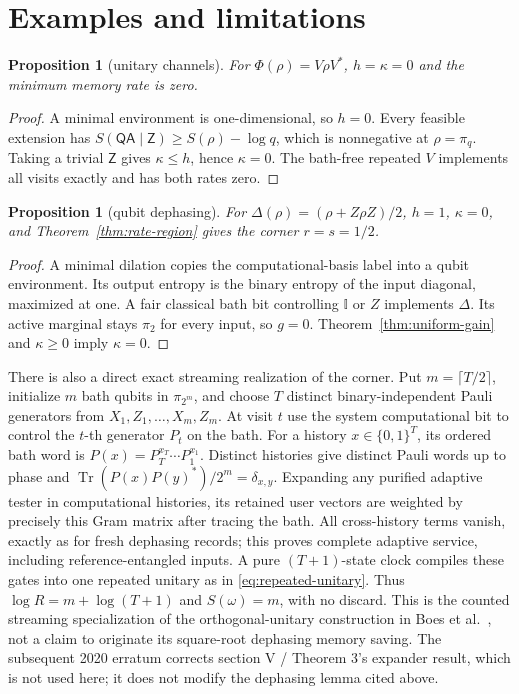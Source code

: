 \documentclass[11pt,a4paper]{article}
\numberwithin{equation}{section}
\theoremstyle{plain}
\newtheorem{proposition}[theorem]{Proposition}
\theoremstyle{definition}
\DeclareMathOperator{\Tr}{Tr}
\newcommand{\rg}[1]{\mathsf{#1}}
\newcommand{\one}{\mathbb{I}}
\begin{document}
\section{Examples and limitations}
\label{sec:examples}

\begin{proposition}[unitary channels]
\label{prop:unitary}
For $\Phi(\rho)=V\rho V^*$, $h=\kappa=0$ and the minimum memory rate is zero.
\end{proposition}

\begin{proof}
A minimal environment is one-dimensional, so $h=0$. Every feasible extension
has $S(\rg{Q}\rg{A}\mid\rg{Z})\ge S(\rho)-\log q$, which is nonnegative at
$\rho=\pi_q$. Taking a trivial $\rg{Z}$ gives $\kappa\le h$, hence $\kappa=0$.
The bath-free repeated $V$ implements all visits exactly and has both rates
zero.
\end{proof}

\begin{proposition}[qubit dephasing]
\label{prop:dephasing}
For $\Delta(\rho)=(\rho+Z\rho Z)/2$, $h=1$, $\kappa=0$, and
Theorem~\ref{thm:rate-region} gives the corner $r=s=1/2$.
\end{proposition}

\begin{proof}
A minimal dilation copies the computational-basis label into a qubit
environment. Its output entropy is the binary entropy of the input diagonal,
maximized at one. A fair classical bath bit controlling $\one$ or $Z$
implements $\Delta$. Its active marginal stays $\pi_2$ for every input, so
$g=0$. Theorem~\ref{thm:uniform-gain} and $\kappa\ge 0$ imply $\kappa=0$.
\end{proof}

There is also a direct exact streaming realization of the corner. Put
$m=\lceil T/2\rceil$, initialize $m$ bath qubits in $\pi_{2^m}$, and choose
$T$ distinct binary-independent Pauli generators from
$X_1,Z_1,\dots,X_m,Z_m$. At visit $t$ use the system computational bit to
control the $t$-th generator $P_t$ on the bath. For a history
$x\in\{0,1\}^T$, its ordered bath word is
$P(x)=P_T^{x_T}\cdots P_1^{x_1}$. Distinct histories give distinct Pauli words
up to phase and $\Tr(P(x)P(y)^*)/2^m=\delta_{x,y}$. Expanding any purified
adaptive tester in computational histories, its retained user vectors are
weighted by precisely this Gram matrix after tracing the bath. All
cross-history terms vanish, exactly as for fresh dephasing records; this
proves complete adaptive service, including reference-entangled inputs. A pure
$(T+1)$-state clock compiles these gates into one repeated unitary as in
\eqref{eq:repeated-unitary}. Thus $\log R=m+\log(T+1)$ and $S(\omega)=m$, with
no discard. This is the counted streaming specialization of the
orthogonal-unitary construction in Boes et al.\ \cite[Lemma 1]{Boes2018}, not a claim to
originate its square-root dephasing memory saving. The subsequent 2020
erratum corrects section V / Theorem 3's expander result, which is not used
here; it does not modify the dephasing lemma cited above.
\end{document}
